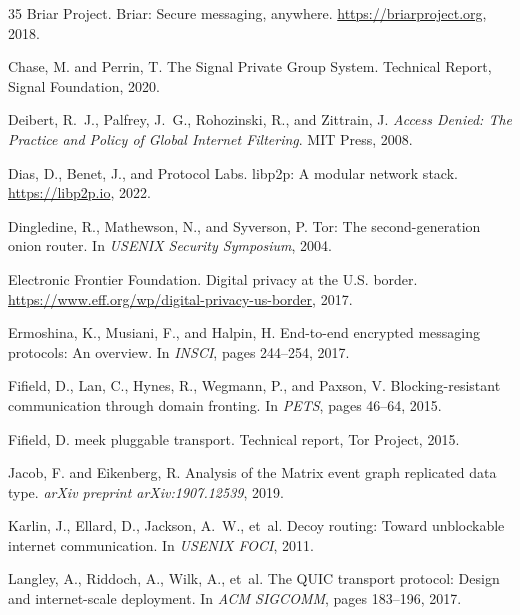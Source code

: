 \documentclass[11pt,a4paper]{article}
\begin{document}
\begin{thebibliography}{35}
Briar Project.
\newblock Briar: Secure messaging, anywhere.
\newblock \url{https://briarproject.org}, 2018.

Chase, M. and Perrin, T.
\newblock The {Signal} Private Group System.
\newblock Technical Report, Signal Foundation, 2020.

Deibert, R.~J., Palfrey, J.~G., Rohozinski, R., and Zittrain, J.
\newblock \emph{Access Denied: The Practice and Policy of Global Internet Filtering}.
\newblock MIT Press, 2008.

Dias, D., Benet, J., and Protocol Labs.
\newblock libp2p: A modular network stack.
\newblock \url{https://libp2p.io}, 2022.

Dingledine, R., Mathewson, N., and Syverson, P.
\newblock Tor: The second-generation onion router.
\newblock In \emph{USENIX Security Symposium}, 2004.

Electronic Frontier Foundation.
\newblock Digital privacy at the {U.S.} border.
\newblock \url{https://www.eff.org/wp/digital-privacy-us-border}, 2017.

Ermoshina, K., Musiani, F., and Halpin, H.
\newblock End-to-end encrypted messaging protocols: An overview.
\newblock In \emph{INSCI}, pages 244--254, 2017.

Fifield, D., Lan, C., Hynes, R., Wegmann, P., and Paxson, V.
\newblock Blocking-resistant communication through domain fronting.
\newblock In \emph{PETS}, pages 46--64, 2015.

Fifield, D.
\newblock meek pluggable transport.
\newblock Technical report, Tor Project, 2015.

Jacob, F. and Eikenberg, R.
\newblock Analysis of the {Matrix} event graph replicated data type.
\newblock \emph{arXiv preprint arXiv:1907.12539}, 2019.

Karlin, J., Ellard, D., Jackson, A.~W., et~al.
\newblock Decoy routing: Toward unblockable internet communication.
\newblock In \emph{USENIX FOCI}, 2011.

Langley, A., Riddoch, A., Wilk, A., et~al.
\newblock The {QUIC} transport protocol: Design and internet-scale deployment.
\newblock In \emph{ACM SIGCOMM}, pages 183--196, 2017.


\end{thebibliography}
\end{document}
